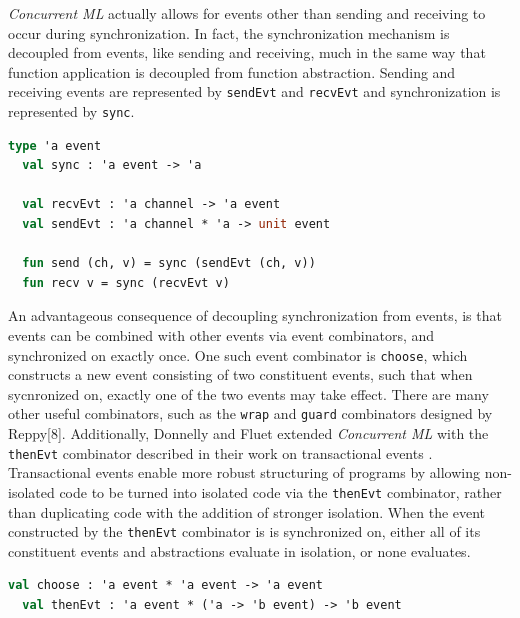 \documentclass{article}
\begin{document}
\textit{Concurrent ML} actually allows for events other than sending and receiving to
occur during synchronization. In fact, the synchronization mechanism is decoupled from
events, like sending and receiving, much in the same way that function application is decoupled
from function abstraction. Sending and receiving events are represented by \lstinline{sendEvt}
and \lstinline{recvEvt} and synchronization is represented by \lstinline{sync}.

\begin{lstlisting}[language=ML, escapechar=\%]
  type 'a event
  val sync : 'a event -> 'a

  val recvEvt : 'a channel -> 'a event
  val sendEvt : 'a channel * 'a -> unit event

  fun send (ch, v) = sync (sendEvt (ch, v))
  fun recv v = sync (recvEvt v)
  \end{lstlisting}

An advantageous consequence of decoupling synchronization from events, is that events can be
combined with other events via event combinators, and synchronized on exactly once. One such
event combinator is \lstinline{choose}, which constructs a new event consisting of two
constituent events, such that when sycnronized on, exactly one of the two events may take
effect. There are many other useful combinators, such as the \lstinline{wrap} and
\lstinline{guard} combinators designed by Reppy[8]. Additionally, Donnelly and Fluet extended
\textit{Concurrent ML} with the \lstinline{thenEvt} combinator described in their work on
transactional events \cite{transactional_events}. Transactional events enable more robust
structuring of programs by allowing non-isolated code to be turned into isolated code via
the \lstinline{thenEvt} combinator, rather than duplicating code with the addition of stronger
isolation. When the event constructed by the \lstinline{thenEvt} combinator is is synchronized
on, either all of its constituent events and abstractions evaluate in isolation, or none
evaluates.

\begin{lstlisting}[language=ML, escapechar=\%]
  val choose : 'a event * 'a event -> 'a event
  val thenEvt : 'a event * ('a -> 'b event) -> 'b event
  \end{lstlisting}
\end{document}
